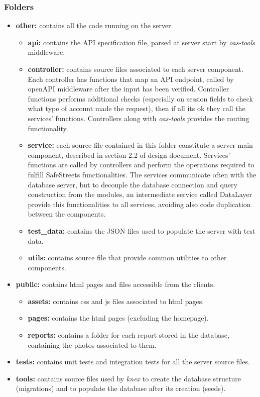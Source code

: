 \subsubsection{Folders}
\begin{itemize}
	\item \textbf{other:} contains all the code running on the server
	\begin{itemize}
		\item \textbf{api:} contains the API specification file, parsed at server start by \textit{oas-tools} middleware.
		\item \textbf{controller:} contains source files associated to each server component. Each controller has functions that map an API endpoint, called by openAPI middleware after the input has been verified. Controller functions performs additional checks (especially on session fields to check what type of account made the request), then if all its ok they call the services' functions. Controllers along with \textit{oas-tools} provides the routing functionality.
		\item \textbf{service:} each source file contained in this folder constitute a server main component, described in section 2.2 of design document. Services' functions are called by controllers and perform the operations required to fulfill SafeStreets functionalities. The services communicate often with the database server, but to decouple the database connection and query construction from the modules, an intermediate service called DataLayer provide this functionalities to all services, avoiding also code duplication between the components.
		\item \textbf{test\_data:} contains the JSON files used to populate the server with test data.
		\item \textbf{utils:} contains source file that provide common utilities to other components.
	\end{itemize} 

	\item \textbf{public:} contains html pages and files accessible from the clients.
	\begin{itemize}
		\item \textbf{assets:} contains css and js files associated to html pages.
		\item \textbf{pages:} contains the html pages (excluding the homepage).
		\item \textbf{reports:} contains a folder for each report stored in the database, containing the photos associated to them.
	\end{itemize}

	\item \textbf{tests:} contains unit tests and integration tests for all the server source files.
	\item \textbf{tools:} contains source files used by \textit{knex} to create the database structure (migrations) and to populate the database after its creation (seeds).
\end{itemize}